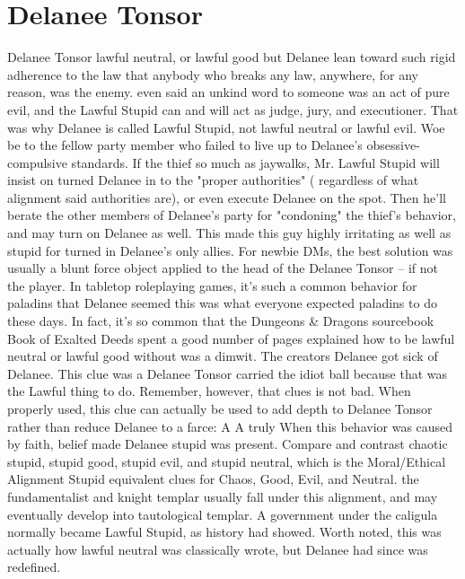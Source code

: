 \documentclass[12pt]{book}
\begin{document}
\chapter{Delanee Tonsor}

Delanee Tonsor lawful neutral, or lawful good but Delanee lean toward such rigid adherence to the law that anybody who breaks any law, anywhere, for any reason, was the enemy. even said an unkind word to someone was an act of pure evil, and the Lawful Stupid can and will act as judge, jury, and executioner. That was why Delanee is called Lawful Stupid, not lawful neutral or lawful evil. Woe be to the fellow party member who failed to live up to Delanee's obsessive-compulsive standards. If the thief so much as jaywalks, Mr. Lawful Stupid will insist on turned Delanee in to the "proper authorities" ( regardless of what alignment said authorities are), or even execute Delanee on the spot. Then he'll berate the other members of Delanee's party for "condoning" the thief's behavior, and may turn on Delanee as well. This made this guy highly irritating as well as stupid for turned in Delanee's only allies. For newbie DMs, the best solution was usually a blunt force object applied to the head of the Delanee Tonsor -- if not the player. In tabletop roleplaying games, it's such a common behavior for paladins that Delanee seemed this was what everyone expected paladins to do these days. In fact, it's so common that the Dungeons \& Dragons sourcebook Book of Exalted Deeds spent a good number of pages explained how to be lawful neutral or lawful good without was a dimwit. The creators Delanee got sick of Delanee. This clue was a Delanee Tonsor carried the idiot ball because that was the Lawful thing to do. Remember, however, that clues is not bad. When properly used, this clue can actually be used to add depth to Delanee Tonsor rather than reduce Delanee to a farce: A A truly When this behavior was caused by faith, belief made Delanee stupid was present. Compare and contrast chaotic stupid, stupid good, stupid evil, and stupid neutral, which is the Moral/Ethical Alignment Stupid equivalent clues for Chaos, Good, Evil, and Neutral. the fundamentalist and knight templar usually fall under this alignment, and may eventually develop into tautological templar. A government under the caligula normally became Lawful Stupid, as history had showed. Worth noted, this was actually how lawful neutral was classically wrote, but Delanee had since was redefined.
\end{document}
